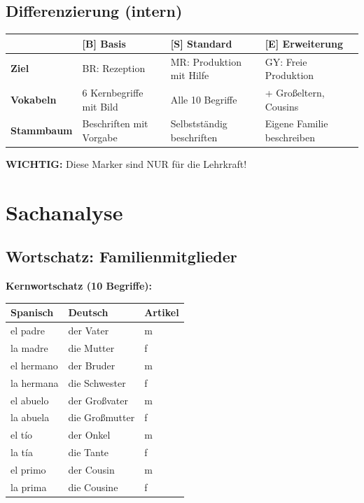 \documentclass[11pt,a4paper]{article}
\newcommand{\B}{\textcolor{basis}{\textbf{[B]}}}
\newcommand{\Std}{\textcolor{standard}{\textbf{[S]}}}
\newcommand{\E}{\textcolor{erweiterung}{\textbf{[E]}}}
\begin{document}
\subsection{Differenzierung (intern)}
\begin{tabular}{|l|p{3.5cm}|p{3.5cm}|p{3.5cm}|}
\hline
& \B{} \textbf{Basis} & \Std{} \textbf{Standard} & \E{} \textbf{Erweiterung} \\
\hline
\textbf{Ziel} & BR: Rezeption & MR: Produktion mit Hilfe & GY: Freie Produktion \\
\hline
\textbf{Vokabeln} & 6 Kernbegriffe mit Bild & Alle 10 Begriffe & + Großeltern, Cousins \\
\hline
\textbf{Stammbaum} & Beschriften mit Vorgabe & Selbstständig beschriften & Eigene Familie beschreiben \\
\hline
\end{tabular}

\vspace{0.5em}
\textbf{WICHTIG:} Diese Marker sind NUR für die Lehrkraft!

\section{Sachanalyse}

\subsection{Wortschatz: Familienmitglieder}

\textbf{Kernwortschatz (10 Begriffe):}
\begin{center}
\begin{tabular}{|l|l|l|}
\hline
\textbf{Spanisch} & \textbf{Deutsch} & \textbf{Artikel} \\
\hline
el padre & der Vater & m \\
la madre & die Mutter & f \\
el hermano & der Bruder & m \\
la hermana & die Schwester & f \\
el abuelo & der Großvater & m \\
la abuela & die Großmutter & f \\
el tío & der Onkel & m \\
la tía & die Tante & f \\
el primo & der Cousin & m \\
la prima & die Cousine & f \\
\hline
\end{tabular}
\end{center}
\end{document}

